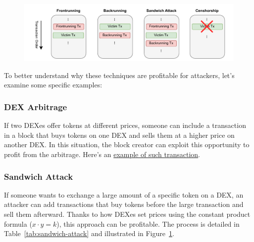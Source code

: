 \documentclass[12pt]{article}
\begin{document}
\begin{figure}[H]
  \centering
  \includegraphics[width=1\textwidth]{MEV.pdf}
  \label{fig:sandwich}
\end{figure}

\noindent
To better understand why these techniques are profitable for attackers, let's examine some specific examples:

\subsubsection*{DEX Arbitrage} If two DEXes offer tokens at different prices, someone can include a transaction in a block that buys tokens on one DEX and sells them at a higher price on another DEX. In this situation, the block creator can exploit this opportunity to profit from the arbitrage. Here's an \href{https://etherscan.io/tx/0x5e1657ef0e9be9bc72efefe59a2528d0d730d478cfc9e6cdd09af9f997bb3ef4}{example of such transaction}.

\subsubsection*{Sandwich Attack}
If someone wants to exchange a large amount of a specific token on a DEX, an attacker can add transactions that buy tokens before the large transaction and sell them afterward. Thanks to how DEXes set prices using the constant product formula ($x \cdot y = k$), this approach can be profitable. The process is detailed in Table~\ref{tab:sandwich-attack} and illustrated in Figure~\ref{fig:sandwich}.
\end{document}
